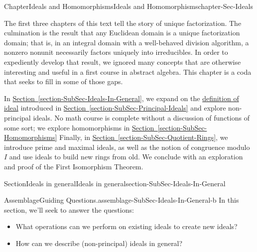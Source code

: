 \documentclass[oneside,10pt,]{book}
\newcommand{\xreffont}{\relax}
\numberwithin{equation}{section}
\begin{document}
%
%
\typeout{************************************************}
\typeout{************************************************}
%
\begin{chapterptx}{Chapter}{Ideals and Homomorphisms}{}{Ideals and Homomorphisms}{}{}{chapter-Sec-Ideals}
\renewcommand*{\chaptername}{Chapter}
\begin{introduction}{}%
The first three chapters of this text tell the story of unique factorization. The culmination is the result that any Euclidean domain is a unique factorization domain; that is, in an integral domain with a well-behaved division algorithm, a nonzero nonunit necessarily factors uniquely into irreducibles. In order to expediently develop that result, we ignored many concepts that are otherwise interesting and useful in a first course in abstract algebra. This chapter is a coda that seeks to fill in some of those gaps.%
\par
In \hyperref[section-SubSec-Ideals-In-General]{Section~{\xreffont\ref{section-SubSec-Ideals-In-General}}}, we expand on the \hyperref[definition-def-ideal]{definition of ideal} introduced in \hyperref[section-SubSec-Principal-Ideals]{Section~{\xreffont\ref{section-SubSec-Principal-Ideals}}} and explore non-principal ideals. No math course is complete without a discussion of functions of some sort; we explore homomorphisms in \hyperref[section-SubSec-Homomorphisms]{Section~{\xreffont\ref{section-SubSec-Homomorphisms}}} Finally, in \hyperref[section-SubSec-Quotient-Rings]{Section~{\xreffont\ref{section-SubSec-Quotient-Rings}}}, we introduce prime and maximal ideals, as well as the notion of congruence modulo \(I\) and use ideals to build new rings from old. We conclude with an exploration and proof of the First Isomorphism Theorem.%
\end{introduction}%
%
%
\typeout{************************************************}
\typeout{************************************************}
%
\begin{sectionptx}{Section}{Ideals in general}{}{Ideals in general}{}{}{section-SubSec-Ideals-In-General}
\begin{assemblage}{Assemblage}{Guiding Questions.}{assemblage-SubSec-Ideals-In-General-b}%
In this section, we'll seek to answer the questions: %
\begin{itemize}[label=\textbullet]
\item{}What operations can we perform on existing ideals to create new ideals?%
\item{}How can we describe (non-principal) ideals in general?%

\end{itemize}
\end{assemblage}
\end{sectionptx}
\end{chapterptx}
\end{document}
